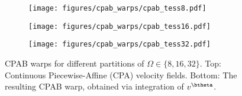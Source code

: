 \begin{figure}[t]
    \centering
    \def\figwidth{0.32\linewidth } %
    \begin{subfigure}{\figwidth}
     \centering
    {\texttt{[image: figures/cpab\_warps/cpab\_tess8.pdf]}\label{fig:cpab:a}}
    \end{subfigure}
    \begin{subfigure}{\figwidth}
     \centering
    {\texttt{[image: figures/cpab\_warps/cpab\_tess16.pdf]}\label{fig:cpab:b}}
    \end{subfigure}
    \begin{subfigure}{\figwidth}
        \centering
       {\texttt{[image: figures/cpab\_warps/cpab\_tess32.pdf]}\label{fig:cpab:c}}
    \end{subfigure}
    
    \caption{
    CPAB warps for different partitions of $\Omega\in{\{8, 16,32\}}$.
     Top: Continuous Piecewise-Affine (CPA) velocity fields.
    Bottom: The resulting CPAB warp, obtained via integration of $v^\btheta$.
    }
    \label{fig:cpab1}
    \end{figure}

